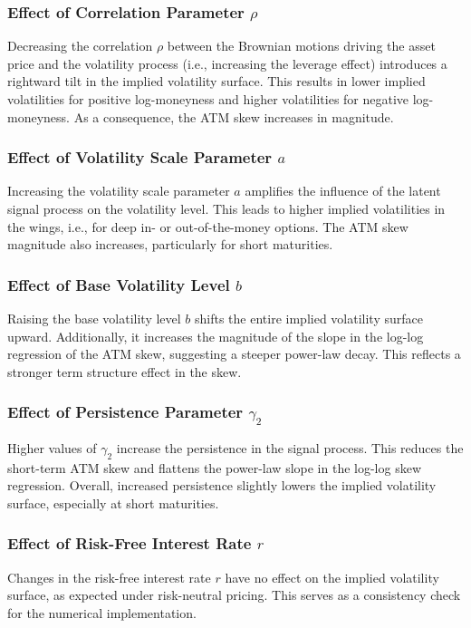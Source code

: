\subsubsection*{Effect of Correlation Parameter $\rho$}
Decreasing the correlation $\rho$ between the Brownian motions driving the asset price and the volatility process (i.e., increasing the leverage effect) introduces a rightward tilt in the implied volatility surface. This results in lower implied volatilities for positive log-moneyness and higher volatilities for negative log-moneyness. As a consequence, the ATM skew increases in magnitude.

\subsubsection*{Effect of Volatility Scale Parameter $a$}
Increasing the volatility scale parameter $a$ amplifies the influence of the latent signal process on the volatility level. This leads to higher implied volatilities in the wings, i.e., for deep in- or out-of-the-money options. The ATM skew magnitude also increases, particularly for short maturities.

\subsubsection*{Effect of Base Volatility Level $b$}
Raising the base volatility level $b$ shifts the entire implied volatility surface upward. Additionally, it increases the magnitude of the slope in the log-log regression of the ATM skew, suggesting a steeper power-law decay. This reflects a stronger term structure effect in the skew.

\subsubsection*{Effect of Persistence Parameter $\gamma_2$}
Higher values of $\gamma_2$ increase the persistence in the signal process. This reduces the short-term ATM skew and flattens the power-law slope in the log-log skew regression. Overall, increased persistence slightly lowers the implied volatility surface, especially at short maturities.

\subsubsection*{Effect of Risk-Free Interest Rate $r$}
Changes in the risk-free interest rate $r$ have no effect on the implied volatility surface, as expected under risk-neutral pricing. This serves as a consistency check for the numerical implementation.


